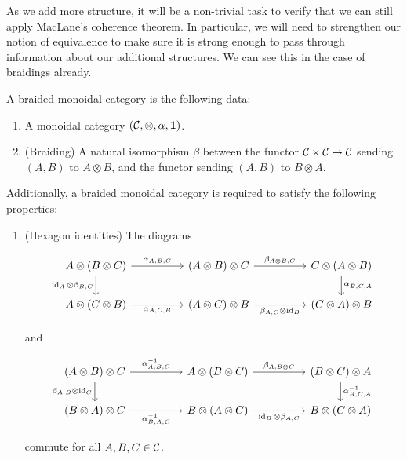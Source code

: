 As we add more structure, it will be a non-trivial task to verify that we can still apply MacLane's coherence theorem. In particular, we will need to strengthen our notion of equivalence to make sure it is strong enough to pass through information about our additional structures. We can see this in the case of braidings already.

\begin{defn} A braided monoidal category is the following data:

\begin{enumerate}
\item A monoidal category $({\mathcal C},\otimes,\alpha, {\mathbf 1})$.
\item (Braiding) A natural isomorphism $\beta$ between the functor ${\mathcal C}\times {\mathcal C}\to {\mathcal C}$ sending $(A,B)$ to $A\otimes B$, and the functor sending $(A,B)$ to $B\otimes A$.
\end{enumerate}

Additionally, a braided monoidal category is required to satisfy the following properties:

\begin{enumerate}
\item (Hexagon identities) The diagrams

\[\begin{tikzcd}
	{A\otimes (B\otimes C)} && {(A\otimes B)\otimes C} && {C\otimes (A\otimes B)} \\
	{A\otimes (C\otimes B)} && {(A\otimes C)\otimes B} && {(C\otimes A)\otimes B}
	\arrow["{\alpha_{A,B,C}}", from=1-1, to=1-3]
	\arrow["{\beta_{A\otimes B,C}}", from=1-3, to=1-5]
	\arrow["{\alpha^{}_{B,C,A}}", from=1-5, to=2-5]
	\arrow["{\id_A\otimes \beta_{B,C}}"', from=1-1, to=2-1]
	\arrow["{\alpha_{A,C,B}}"', from=2-1, to=2-3]
	\arrow["{\beta_{A,C}\otimes \id_B}"', from=2-3, to=2-5]
\end{tikzcd}\]

and

\[\begin{tikzcd}
	{(A\otimes B)\otimes C} && {A\otimes (B\otimes C)} && {(B\otimes C)\otimes A} \\
	{(B\otimes A)\otimes C} && {B\otimes (A\otimes C)} && {B\otimes (C\otimes A)}
	\arrow["{\alpha^{-1}_{A,B,C}}", from=1-1, to=1-3]
	\arrow["{\beta_{A,B\otimes C}}", from=1-3, to=1-5]
	\arrow["{\alpha^{-1}_{B,C,A}}", from=1-5, to=2-5]
	\arrow["{\beta_{A,B}\otimes \id_C}"', from=1-1, to=2-1]
	\arrow["{\alpha^{-1}_{B,A,C}}"', from=2-1, to=2-3]
	\arrow["{\id_B\otimes \beta_{A,C}}"', from=2-3, to=2-5]
\end{tikzcd}\]

commute for all $A,B,C\in {\mathcal C}$.
\end{enumerate}


\end{defn}


